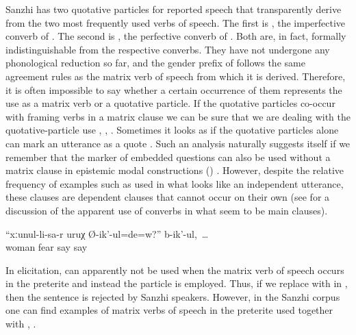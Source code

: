 Sanzhi has two quotative particles for reported speech that transparently derive from the two most frequently used verbs of speech. The first is , the imperfective converb of . The second is , the perfective converb of . Both are, in fact, formally indistinguishable from the respective converbs. They have not undergone any phonological reduction so far, and the gender prefix of  follows the same agreement rules as the matrix verb of speech from which it is derived. Therefore, it is often impossible to say whether a certain occurrence of them represents the use as a matrix verb or a quotative particle. If the quotative particles co-occur with framing verbs in a matrix clause we can be sure that we are dealing with the quotative-particle use , , . Sometimes it looks as if the quotative particles alone can mark an utterance as a quote . Such an analysis naturally suggests itself if we remember that the marker of embedded questions can also be used without a matrix clause in epistemic modal constructions () \citep{ForkerLTSanzhi}. However, despite the relative frequency of examples such as  used in what looks like an independent utterance, these clauses are dependent clauses that cannot occur on their own (see  for a discussion of the apparent use of converbs in what seem to be main clauses).
%
\begin{exe}
	\ex	\label{ex:Are you afraid of your wife?, they say and}
	\gll	``xːunul-li-sa-r	uruχ	Ø-ik'-ul=de=w?''	b-ik'-ul,~\ldots\\
		woman	fear	say	say\\
	\glt	{}
\end{exe}

In elicitation,  can apparently not be used when the matrix verb of speech occurs in the preterite and instead the particle  is employed. Thus, if we replace  with  in , then the sentence is rejected by Sanzhi speakers. However, in the Sanzhi corpus one can find examples of matrix verbs of speech in the preterite used together with  , .

